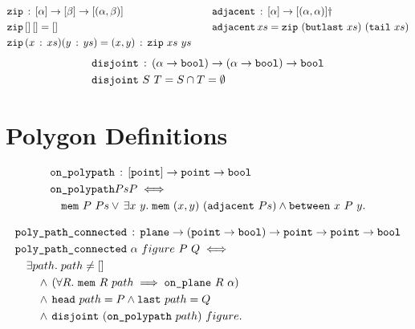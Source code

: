 \begin{align*}
  & \code{zip}\,:\,[\alpha]\rightarrow[\beta]\rightarrow[(\alpha,\beta)] &\quad
  & \code{adjacent}\,:\,[\alpha]\rightarrow[(\alpha,\alpha)]\dag\\
  & \code{zip}\,[]\,[] = [] &\quad
  & \code{adjacent}\,xs = \code{zip}\ (\code{butlast}\ xs)\ (\code{tail}\ xs)\\
  & \code{zip}\,(\cons{x}{xs})(\cons{y}{ys}) = \cons{(x,y)}{\code{zip}\ xs\ ys}
\end{align*}
\begin{align*}
  & \texttt{disjoint}\,:\,(\alpha\rightarrow\texttt{bool})\rightarrow(\alpha\rightarrow\texttt{bool})\rightarrow\texttt{bool}\\
  & \texttt{disjoint}\ S\ T = S \cap T = \emptyset
\end{align*}

\section{Polygon Definitions}
\begin{align*}
  &\code{on\_polypath}\,:\,[\code{point}] \rightarrow \code{point} \rightarrow \code{bool}\\
  &\code{on\_polypath}{Ps}{P} \iff\\
  &\quad\code{mem}\ P\ Ps\vee\,\exists x\ y.\; \code{mem}\ (x,y)\ (\code{adjacent}\ Ps) \wedge \between{x}{P}{y}.
\end{align*}

\begin{align*}
  &\code{poly\_path\_connected}\,:\,\code{plane}\rightarrow(\code{point} \rightarrow \code{bool}) \rightarrow \code{point} \rightarrow \code{point} \rightarrow \code{bool}\\
  &\code{poly\_path\_connected}\ \alpha\ figure\ P\ Q \iff\\
  &\quad\exists path.\; path \neq []\\
  &\qquad\wedge\,(\forall R.\ \code{mem}\ R\ path \implies \onplane{R}{\alpha})\\
  &\qquad\wedge\,\code{head}\ path = P \wedge \code{last}\ path = Q\\
  &\qquad\wedge\,\code{disjoint}\ (\code{on\_polypath}\ path)\ figure.
\end{align*}

